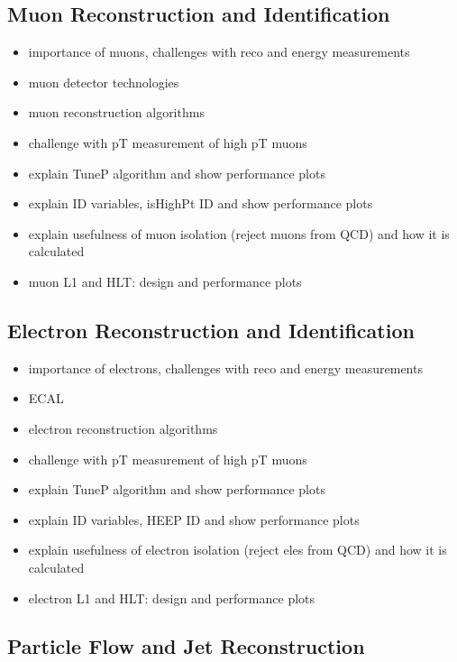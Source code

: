 \subsection{Muon Reconstruction and Identification}
\begin{itemize}
	\item importance of muons, challenges with reco and energy measurements
	\item muon detector technologies
	\item muon reconstruction algorithms
	\item challenge with pT measurement of high pT muons
	\item explain TuneP algorithm and show performance plots
	\item explain ID variables, isHighPt ID and show performance plots
	\item explain usefulness of muon isolation (reject muons from QCD) and how it is calculated
	\item muon L1 and HLT: design and performance plots
\end{itemize}

\subsection{Electron Reconstruction and Identification}
\begin{itemize}
	\item importance of electrons, challenges with reco and energy measurements
	\item ECAL
	\item electron reconstruction algorithms
	\item challenge with pT measurement of high pT muons
	\item explain TuneP algorithm and show performance plots
	\item explain ID variables, HEEP ID and show performance plots
	\item explain usefulness of electron isolation (reject eles from QCD) and how it is calculated
	\item electron L1 and HLT: design and performance plots
\end{itemize}



\subsection{Particle Flow and Jet Reconstruction}



